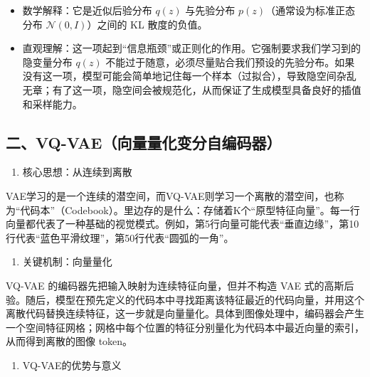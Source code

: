 \begin{itemize}
\tightlist
\item
  数学解释：它是近似后验分布 \(q(z)\) 与先验分布 \(p(z)\)（通常设为标准正态分布 \(\mathcal{N}(0, I)\)）之间的 KL 散度的负值。
\item
  直观理解：这一项起到``信息瓶颈''或正则化的作用。它强制要求我们学习到的隐变量分布 \(q(z)\) 不能过于随意，必须尽量贴合我们预设的先验分布。如果没有这一项，模型可能会简单地记住每一个样本（过拟合），导致隐空间杂乱无章；有了这一项，隐空间会被规范化，从而保证了生成模型具备良好的插值和采样能力。
\end{itemize}

\hypertarget{ux4e8cvq-vaeux5411ux91cfux91cfux5316ux53d8ux5206ux81eaux7f16ux7801ux5668}{%
\subsection{二、VQ-VAE（向量量化变分自编码器）}\label{ux4e8cvq-vaeux5411ux91cfux91cfux5316ux53d8ux5206ux81eaux7f16ux7801ux5668}}

\begin{enumerate}
\def\labelenumi{\arabic{enumi}.}
\tightlist
\item
  核心思想：从连续到离散
\end{enumerate}

VAE学习的是一个连续的潜空间，而VQ-VAE则学习一个离散的潜空间，也称为``代码本''（Codebook）。里边存的是什么：存储着K个``原型特征向量''。每一行向量都代表了一种基础的视觉模式。例如，第5行向量可能代表``垂直边缘''，第10行代表``蓝色平滑纹理''，第50行代表``圆弧的一角''。

\begin{enumerate}
\def\labelenumi{\arabic{enumi}.}
\setcounter{enumi}{1}
\tightlist
\item
  关键机制：向量量化
\end{enumerate}

VQ-VAE 的编码器先把输入映射为连续特征向量，但并不构造 VAE 式的高斯后验。随后，模型在预先定义的代码本中寻找距离该特征最近的代码向量，并用这个离散代码替换连续特征，这一步就是向量量化。具体到图像处理中，编码器会产生一个空间特征网格；网格中每个位置的特征分别量化为代码本中最近向量的索引，从而得到离散的图像 token。

\begin{enumerate}
\def\labelenumi{\arabic{enumi}.}
\setcounter{enumi}{2}
\tightlist
\item
  VQ-VAE的优势与意义
\end{enumerate}

